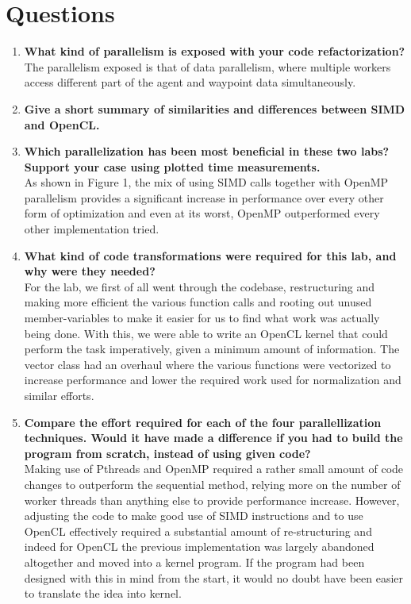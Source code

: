 \documentclass[a4paper,11pt]{article}
\begin{document}
\section{Questions}
\begin{enumerate}[label=\Alph*.]
\item \textbf{What kind of parallelism is exposed with your code
  refactorization?}\\
  The parallelism exposed is that of data parallelism, where multiple workers access different part of the agent and waypoint data simultaneously.
\item \textbf{Give a short summary of similarities and differences
  between SIMD and OpenCL.}\\

\item \textbf{Which parallelization has been most beneficial in these
  two labs? Support your case using plotted time measurements.}\\
  As shown in Figure 1, the mix of using SIMD calls together with OpenMP parallelism provides a significant increase in performance over every other form of optimization and even at its worst, OpenMP outperformed every other implementation tried.

\item \textbf{What kind of code transformations were required for this
  lab, and why were they needed?}\\
  For the lab, we first of all went through the codebase, restructuring and making more efficient the various function calls and rooting out unused member-variables to make it easier for us to find what work was actually being done. With this, we were able to write an OpenCL kernel that could perform the task imperatively, given a minimum amount of information. The vector class had an overhaul where the various functions were vectorized to increase performance and lower the required work used for normalization and similar efforts.

\item \textbf{Compare the effort required for each of the four
  parallellization techniques. Would it have made a difference if you
  had to build the program from scratch, instead of using given
  code?}\\
Making use of Pthreads and OpenMP required a rather small amount of code changes to outperform the sequential method, relying more on the number of worker threads than anything else to provide performance increase. However, adjusting the code to make good use of SIMD instructions and to use OpenCL effectively required a substantial amount of re-structuring and indeed for OpenCL the previous implementation was largely abandoned altogether and moved into a kernel program. If the program had been designed with this in mind from the start, it would no doubt have been easier to translate the idea into kernel.
\end{enumerate}
\end{document}
